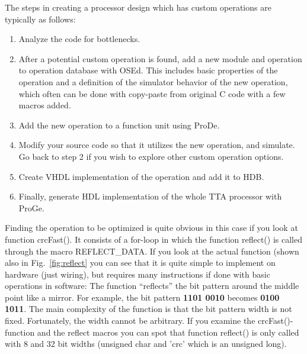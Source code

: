 \documentclass[a4paper,twoside]{tceusermanual}
\begin{document}
The steps in creating a processor design which has custom operations
are typically as follows:

\begin{enumerate}
\item Analyze the code for bottlenecks.

\item After a potential custom operation is found, add a new module and
  operation to operation database with OSEd. This includes basic
  properties of the operation and a definition of the simulator behavior
  of the new operation, which often can be done with copy-paste from
  original C code with a few macros added.

\item Add the new operation to a function unit using ProDe.

\item Modify your source code so that it utilizes the new operation,
  and simulate. Go back to step 2 if you wish to explore other
  custom operation options.

\item Create VHDL implementation of the operation and add it to HDB.

\item Finally, generate HDL implementation of the whole TTA processor with ProGe.
\end{enumerate}


Finding the operation to be optimized is quite obvious in this case if
you look at function crcFast(). It consists of a for-loop in which the
function reflect() is called through the macro REFLECT\_DATA. If you
look at the actual function (shown also in Fig.~\ref{fig:reflect} you
can see that it is quite simple to implement on hardware (just wiring),
but requires many instructions if done with basic operations in software: The
function ``reflects'' the bit pattern around the middle point like a
mirror. For example, the bit pattern \textbf{1101 0010} becomes
\textbf{0100 1011}. The main complexity of the function is that the bit 
pattern width is not fixed. Fortunately, the width cannot be
arbitrary. If you examine the crcFast()-function and the reflect
macros you can spot that function reflect() is only called with 8 and
32 bit widths (unsigned char and 'crc' which is an unsigned long).
\end{document}
